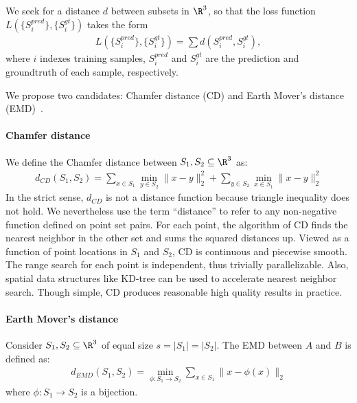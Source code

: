 We seek for a distance $d$ between subsets in $\R^3$, so that the loss function $L(\{S^{pred}_i\}, \{S^{gt}_i\})$ takes the form
\begin{align}
    L(\{S^{pred}_i\}, \{S^{gt}_i\}) = \sum d(S^{pred}_i, S^{gt}_i),
    \label{eqn:loss}
\end{align}
where $i$ indexes training samples, $S_i^{pred}$ and $S_i^{gt}$ are the prediction and groundtruth of each sample, respectively.

We propose two candidates: Chamfer distance (CD) and Earth Mover's distance (EMD)~\cite{rubner2000earth}.

\paragraph{Chamfer distance} We define the Chamfer distance between $S_1, S_2\subseteq \R^3$ as:
\begin{align*}
d_{CD}(S_1, S_2)=\sum_{x\in S_1}\min_{y\in S_2} \|x-y\|^2_2+\sum_{y\in S_2}\min_{x\in S_1} \|x-y\|^2_2
\end{align*}
In the strict sense, $d_{CD}$ is not a distance function because triangle inequality does not hold. We nevertheless use the term ``distance'' to refer to any non-negative function defined on point set pairs. For each point, the algorithm of CD finds the nearest neighbor in the other set and sums the squared distances up.   Viewed as a function of point locations in $S_1$ and $S_2$, $\mbox{CD}$ is continuous and piecewise smooth. The range search for each point is independent, thus trivially parallelizable. Also, spatial data structures like KD-tree can be used to accelerate nearest neighbor search. Though simple, CD produces reasonable high quality results in practice.

\paragraph{Earth Mover's distance} 

Consider $S_1, S_2\subseteq \R^3$ of equal size $s=|S_1|=|S_2|$. The EMD between $A$ and $B$ is defined as:
\begin{align*}
d_{EMD}(S_1, S_2)=\min_{\phi:S_1\rightarrow S_2} \sum_{x\in S_1} \|x-\phi(x)\|_2
\end{align*}
where $\phi:S_1\rightarrow S_2$ is a bijection.

